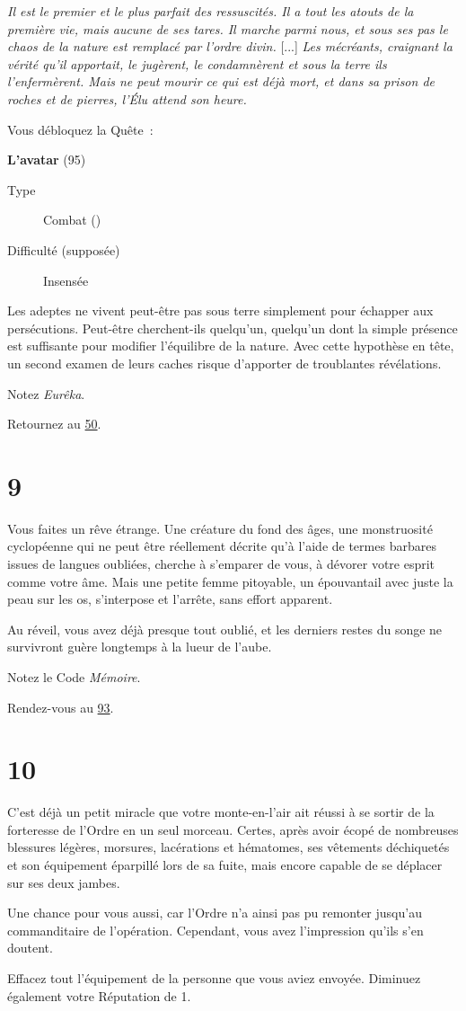 \documentclass{report}
\newcommand{\gsection}[1]{
    \section{#1}
    \label{section-#1}
}
\newcommand{\glink}[1]{\hyperref[section-#1]{#1}}
\newcommand{\quest}[5]{
    \begin{mdframed}[innertopmargin=0.5cm,innerbottommargin=0.5cm,leftmargin=0.5cm,rightmargin=0.5cm]
        \begin{center}
            \textbf{#1} (#2)
        \end{center}
        \begin{description}
            \item[Type] #3
            \item[Difficulté (supposée)] #4
        \end{description}
        #5
    \end{mdframed}
}
\begin{document}
\textit{Il est le premier et le plus parfait des ressuscités. Il a tout les atouts de la première vie, mais aucune de ses tares. Il marche parmi nous, et sous ses pas le chaos de la nature est remplacé par l'ordre divin.} [...] \textit{Les mécréants, craignant la vérité qu'il apportait, le jugèrent, le condamnèrent et sous la terre ils l'enfermèrent. Mais ne peut mourir ce qui est déjà mort, et dans sa prison de roches et de pierres, l'Élu attend son heure.}

Vous débloquez la Quête :

\quest{L'avatar}{95}{Combat (\ankh)}{Insensée}{
Les adeptes ne vivent peut-être pas sous terre simplement pour échapper aux persécutions. Peut-être cherchent-ils quelqu'un, quelqu'un dont la simple présence est suffisante pour modifier l'équilibre de la nature. Avec cette hypothèse en tête, un second examen de leurs caches risque d'apporter de troublantes révélations.
}

Notez \emph{Eurêka}.

Retournez au \glink{50}.

\gsection{9}

Vous faites un rêve étrange. Une créature du fond des âges, une monstruosité cyclopéenne qui ne peut être réellement décrite qu'à l'aide de termes barbares issues de langues oubliées, cherche à s'emparer de vous, à dévorer votre esprit comme votre âme. Mais une petite femme pitoyable, un épouvantail avec juste la peau sur les os, s'interpose et l'arrête, sans effort apparent.

Au réveil, vous avez déjà presque tout oublié, et les derniers restes du songe ne survivront guère longtemps à la lueur de l'aube.

Notez le Code \emph{Mémoire}.

Rendez-vous au \glink{93}.

\gsection{10}

C'est déjà un petit miracle que votre monte-en-l'air ait réussi à se sortir de la forteresse de l'Ordre en un seul morceau. Certes, après avoir écopé de nombreuses blessures légères, morsures, lacérations et hématomes, ses vêtements déchiquetés et son équipement éparpillé lors de sa fuite, mais encore capable de se déplacer sur ses deux jambes.

Une chance pour vous aussi, car l'Ordre n'a ainsi pas pu remonter jusqu'au commanditaire de l'opération. Cependant, vous avez l'impression qu'ils s'en doutent.

Effacez tout l'équipement de la personne que vous aviez envoyée. Diminuez également votre Réputation de 1.
\end{document}
